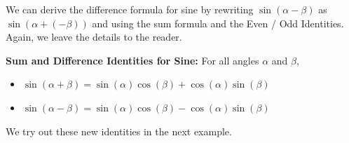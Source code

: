 \documentclass{ximera}
\begin{document}
We can derive the difference formula for sine by rewriting  $\sin(\alpha - \beta)$ as $\sin(\alpha + (-\beta))$ and using the sum formula and the Even / Odd Identities. Again, we leave the details to the reader.

\medskip


\begin{theorem} \label{sinesumdifference}  \textbf{Sum and Difference Identities for Sine:} For all angles $\alpha$ and $\beta$,  

\begin{itemize}

\item  $\sin(\alpha + \beta) = \sin(\alpha) \cos(\beta) + \cos(\alpha) \sin(\beta)$

\item $\sin(\alpha - \beta) = \sin(\alpha) \cos(\beta) - \cos(\alpha) \sin(\beta)$

\end{itemize}

\end{theorem}

 


 

We try out these new identities in the next example.

 
\end{document}
